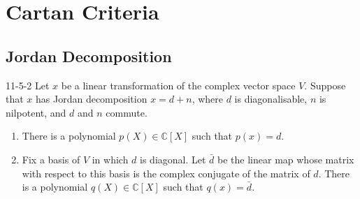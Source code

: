 \documentclass[../main.tex]{subfiles}
\begin{document}
\ifSubfilesClassLoaded{

    
}{}

\chapter{ Cartan Criteria }

\section{Jordan Decomposition}

\begin{lemma}{}{11-5-2}
Let $x$ be a linear transformation of the complex vector space $V$. Suppose that $x$ has Jordan decomposition $x = d + n$, where $d$ is diagonalisable, $n$ is nilpotent, and $d$ and $n$ commute.

\begin{enumerate}
\item[(a)] There is a polynomial $p(X) \in \mathbb{C}[X]$ such that $p(x) = d$.

\item[(b)] Fix a basis of $V$ in which $d$ is diagonal. Let $\bar{d}$ be the linear map whose matrix with respect to this basis is the complex conjugate of the matrix of $d$. There is a polynomial $q(X) \in \mathbb{C}[X]$ such that $q(x) = \bar{d}$.
\end{enumerate}
\end{lemma}
\end{document}
